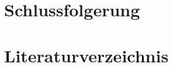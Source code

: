 \documentclass[12pt, a4paper]{report}
\begin{document}
	
	\chapter{Schlussfolgerung}
	
	
	
	
	
	
	\chapter{Literaturverzeichnis}
	\patchcmd{\thebibliography}{\chapter*}{\section*}{}{}
	\renewcommand{\bibname}{}
	
	
	
\end{document}
